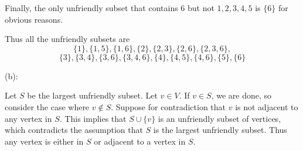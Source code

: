 \documentclass{eh-homework}
\begin{document}
\begin{question}{1}
        Finally, the only unfriendly subset that contains \(6\) but not \(1,2,3,4,5\) is \(\{ 6 \}\) for obvious reasons.

        Thus all the unfriendly subsets are
        \[
            \{ 1 \} ,\{ 1,5 \} ,\{ 1,6 \},\{ 2 \} , \{ 2,3 \} , \{ 2,6 \} , \{ 2,3,6 \},
        \]
        \[
            \{ 3 \} , \{ 3,4 \} , \{ 3,6 \} , \{ 3,4,6 \},\{ 4 \}, \{ 4,5 \} , \{ 4,6 \},\{ 5 \}, \{ 6 \}
        \]

        \medskip

        (b):

        Let \(S\) be the largest unfriendly subset. Let \(v \in V\). If \(v \in S\), we are done, so consider the case where \(v \notin S\). Suppose for contradiction that \(v\) is not adjacent to any vertex in \(S\). This implies that \(S \cup \{ v \}\) is an unfriendly subset of vertices, which contradicts the assumption that \(S\) is the largest unfriendly subset. Thus any vertex is either in \(S\) or adjacent to a vertex in \(S\).
    \end{question}
\end{document}
